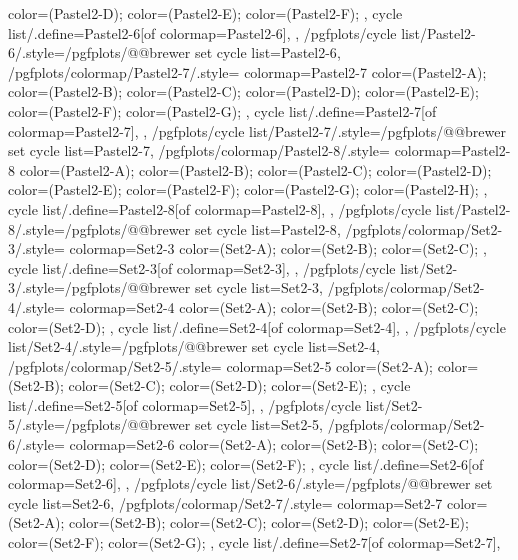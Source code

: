 {{{      color=(Pastel2-D);
      color=(Pastel2-E);
      color=(Pastel2-F);
    },
    cycle list/.define={Pastel2-6}{[of colormap=Pastel2-6]},
  },
  /pgfplots/cycle list/Pastel2-6/.style={/pgfplots/@@brewer set cycle list={Pastel2-6}},
  /pgfplots/colormap/Pastel2-7/.style={
    colormap={Pastel2-7}{
      color=(Pastel2-A);
      color=(Pastel2-B);
      color=(Pastel2-C);
      color=(Pastel2-D);
      color=(Pastel2-E);
      color=(Pastel2-F);
      color=(Pastel2-G);
    },
    cycle list/.define={Pastel2-7}{[of colormap=Pastel2-7]},
  },
  /pgfplots/cycle list/Pastel2-7/.style={/pgfplots/@@brewer set cycle list={Pastel2-7}},
  /pgfplots/colormap/Pastel2-8/.style={
    colormap={Pastel2-8}{
      color=(Pastel2-A);
      color=(Pastel2-B);
      color=(Pastel2-C);
      color=(Pastel2-D);
      color=(Pastel2-E);
      color=(Pastel2-F);
      color=(Pastel2-G);
      color=(Pastel2-H);
    },
    cycle list/.define={Pastel2-8}{[of colormap=Pastel2-8]},
  },
  /pgfplots/cycle list/Pastel2-8/.style={/pgfplots/@@brewer set cycle list={Pastel2-8}},
  /pgfplots/colormap/Set2-3/.style={
    colormap={Set2-3}{
      color=(Set2-A);
      color=(Set2-B);
      color=(Set2-C);
    },
    cycle list/.define={Set2-3}{[of colormap=Set2-3]},
  },
  /pgfplots/cycle list/Set2-3/.style={/pgfplots/@@brewer set cycle list={Set2-3}},
  /pgfplots/colormap/Set2-4/.style={
    colormap={Set2-4}{
      color=(Set2-A);
      color=(Set2-B);
      color=(Set2-C);
      color=(Set2-D);
    },
    cycle list/.define={Set2-4}{[of colormap=Set2-4]},
  },
  /pgfplots/cycle list/Set2-4/.style={/pgfplots/@@brewer set cycle list={Set2-4}},
  /pgfplots/colormap/Set2-5/.style={
    colormap={Set2-5}{
      color=(Set2-A);
      color=(Set2-B);
      color=(Set2-C);
      color=(Set2-D);
      color=(Set2-E);
    },
    cycle list/.define={Set2-5}{[of colormap=Set2-5]},
  },
  /pgfplots/cycle list/Set2-5/.style={/pgfplots/@@brewer set cycle list={Set2-5}},
  /pgfplots/colormap/Set2-6/.style={
    colormap={Set2-6}{
      color=(Set2-A);
      color=(Set2-B);
      color=(Set2-C);
      color=(Set2-D);
      color=(Set2-E);
      color=(Set2-F);
    },
    cycle list/.define={Set2-6}{[of colormap=Set2-6]},
  },
  /pgfplots/cycle list/Set2-6/.style={/pgfplots/@@brewer set cycle list={Set2-6}},
  /pgfplots/colormap/Set2-7/.style={
    colormap={Set2-7}{
      color=(Set2-A);
      color=(Set2-B);
      color=(Set2-C);
      color=(Set2-D);
      color=(Set2-E);
      color=(Set2-F);
      color=(Set2-G);
    },
    cycle list/.define={Set2-7}{[of colormap=Set2-7]},
}}
